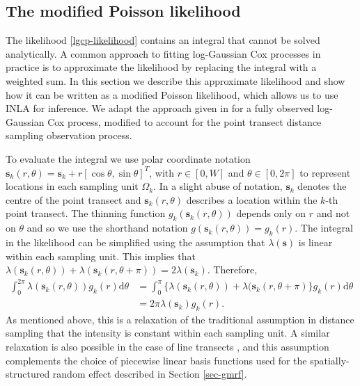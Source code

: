 \documentclass{statsoc}
\newcommand{\bs}{\mathbf{s}}
\begin{document}
\subsection{The modified Poisson likelihood}
\label{sec-lgcp}

\sloppy The likelihood \eqref{lgcp-likelihood} contains an integral that cannot be solved analytically.  A common approach to fitting log-Gaussian Cox processes in practice is to approximate the likelihood by replacing the integral with a weighted sum.  In this section we describe this approximate likelihood and show how it can be written as a modified Poisson likelihood, which allows us to use INLA for inference.  We adapt the approach given in \cite{simpson_going_2016} for a fully observed log-Gaussian Cox process, modified to account for the point transect distance sampling observation process.

To evaluate the integral we use polar coordinate notation $\bs_k(r, \theta) = \bs_k + r\left[\cos\theta, \sin\theta \right]^T$, with $r \in [0, W]$ and $\theta \in [0, 2\pi]$ to represent locations in each sampling unit $\Omega_k$.  In a slight abuse of notation, $\bs_k$ denotes the centre of the point transect and $\bs_k(r,\theta)$ describes a location within the $k$-th point transect. The thinning function $g_k(\bs_k(r, \theta))$ depends only on $r$ and not on $\theta$ and so we use the shorthand notation $ g(\bs_k(r, \theta)) = g_k(r)$. The integral in the likelihood can be simplified using the assumption that $\lambda(\bs)$ is linear within each sampling unit.  This implies that $\lambda(\bs_k(r, \theta)) + \lambda(\bs_k(r, \theta + \pi)) = 2\lambda(\bs_k)$.  Therefore,
\begin{align}
\label{eq-linear-intensity}
	\int_0^{2\pi} \lambda(\bs_k(r, \theta))g_k(r)\mathrm{d}\theta &= \int_0^\pi \{\lambda(\bs_k(r, \theta)) + \lambda(\bs_k(r, \theta + \pi) \} g_k(r)\mathrm{d}\theta \nonumber \\
	&= 2\pi \lambda(\bs_k)g_k(r).
\end{align}
As mentioned above, this is a relaxation of the traditional assumption in distance sampling that the intensity is constant within each sampling unit.  A similar relaxation is also possible in the case of line transects \citep{yuan_point_2017}, and this assumption complements the choice of piecewise linear basis functions used for the spatially-structured random effect described in Section \ref{sec-gmrf}.
\end{document}
